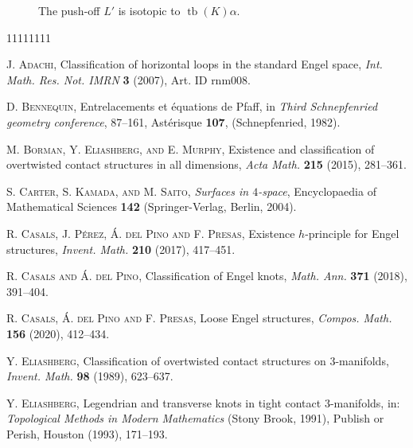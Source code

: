 \documentclass{amsart} %
\DeclareMathOperator{\tb}{tb}
\theoremstyle{thm}
\theoremstyle{definition}
\begin{document}
\begin{figure}[htbp] 
	\centering
	\def\svgwidth{0,99\columnwidth}
	
	\caption{The push-off $L'$ is isotopic to $\tb(K)\alpha$.}
	\label{fig:Legendretori}
\end{figure}



\begin{thebibliography} {11111111} %
	
	 \textsc{J. Adachi}, Classification of horizontal loops in the standard Engel space, \textit{Int. Math. Res. Not. IMRN} \textbf{3} (2007), Art. ID rnm008.
	
		 \textsc{D. Bennequin}, Entrelacements et \'{e}quations de {P}faff, in \textit{Third {S}chnepfenried geometry conference}, 87--161, Ast\'{e}risque \textbf{107}, ({S}chnepfenried, 1982).
		
	
	 \textsc{M. Borman, Y. Eliashberg, and E. Murphy}, Existence and classification of overtwisted contact structures in all dimensions, \textit{Acta Math.} \textbf{215} (2015), 281--361.
	
	 \textsc{S. Carter, S. Kamada, and M. Saito}, \textit{Surfaces in $4$-space}, Encyclopaedia of Mathematical Sciences \textbf{142}  (Springer-Verlag, Berlin, 2004).
	
	
	
 \textsc{R. Casals, J. P\'{e}rez, \'{A}. del Pino and F. Presas}, Existence $h$-principle for Engel structures, \textit{Invent. Math.} \textbf{210} (2017), 417--451.

 \textsc{R. Casals and \'{A}. del Pino}, Classification of Engel knots, \textit{Math. Ann.} \textbf{371} (2018), 391--404.

 \textsc{R. Casals, \'{A}. del Pino and F. Presas}, Loose Engel structures, \textit{Compos. Math.} \textbf{156} (2020), 412--434.

 \textsc{Y. Eliashberg}, Classification of overtwisted contact structures on $3$-manifolds, \textit{Invent. Math.} \textbf{98} (1989), 623--637.


 \textsc{Y. Eliashberg}, Legendrian and transverse knots in tight contact $3$-manifolds, in: \textit{Topological Methods in Modern Mathematics} (Stony Brook, 1991), Publish or Perish, Houston (1993), 171--193.



\end{thebibliography}
\end{document}
